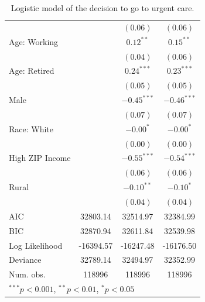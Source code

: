\documentclass[12pt,twoside]{reedthesis}
\begin{document}
\begin{table}
\begin{center}
\begin{small}
\begin{tabular}{l c c c }
                                &               & $(0.06)$      & $(0.06)$      \\
  Age: Working                  &               & $0.12^{**}$   & $0.15^{**}$   \\
                                &               & $(0.04)$      & $(0.06)$      \\
  Age: Retired                  &               & $0.24^{***}$  & $0.23^{***}$  \\
                                &               & $(0.05)$      & $(0.05)$      \\
  Male                          &               & $-0.45^{***}$ & $-0.46^{***}$ \\
                                &               & $(0.07)$      & $(0.07)$      \\
  Race: White                   &               & $-0.00^{*}$   & $-0.00^{*}$   \\
                                &               & $(0.00)$      & $(0.00)$      \\
  High ZIP Income               &               & $-0.55^{***}$ & $-0.54^{***}$ \\
                                &               & $(0.06)$      & $(0.06)$      \\
  Rural                         &               & $-0.10^{**}$  & $-0.10^{*}$   \\
                                &               & $(0.04)$      & $(0.04)$      \\
  \hline
  AIC                           & 32803.14      & 32514.97      & 32384.99      \\
  BIC                           & 32870.94      & 32611.84      & 32539.98      \\
  Log Likelihood                & -16394.57     & -16247.48     & -16176.50     \\
  Deviance                      & 32789.14      & 32494.97      & 32352.99      \\
  Num. obs.                     & 118996        & 118996        & 118996        \\
  \hline
  \multicolumn{4}{l}{\tiny{$^{***}p<0.001$, $^{**}p<0.01$, $^*p<0.05$}}
  \end{tabular}
  \end{small}
  \caption{Logistic model of the decision to go to urgent care.}
  \label{table:coefficients}
  \end{center}
  \end{table}
  
\end{document}
